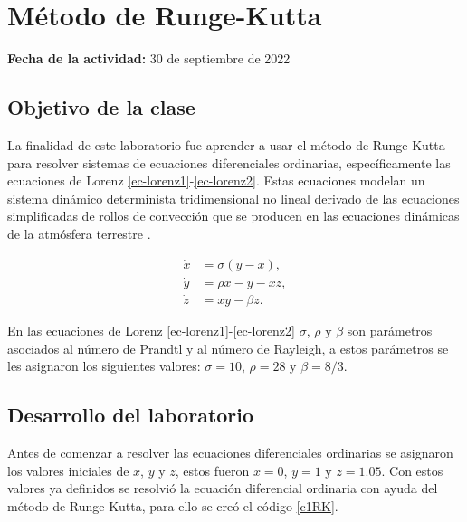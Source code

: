 \documentclass[../portafolio.tex]{subfiles}
\begin{document}
\section{Método de Runge-Kutta} 

\hfill \textbf{Fecha de la actividad:} 30 de septiembre de 2022

\medskip


\subsection{Objetivo de la clase}
La finalidad de este laboratorio fue aprender a usar el método de Runge-Kutta para resolver sistemas de ecuaciones diferenciales ordinarias, específicamente las ecuaciones de Lorenz \ref{ec-lorenz1}-\ref{ec-lorenz2}. Estas ecuaciones modelan un sistema dinámico determinista tridimensional no lineal derivado de las ecuaciones simplificadas de rollos de convección que se producen en las ecuaciones dinámicas de la atmósfera terrestre \cite{ec-de-lorenz}.

\begin{align}
    \dot{x} &= \sigma (y-x),  \label{ec-lorenz1}\\
    \dot{y} &= \rho x -y -xz, \\
    \dot{z} &= xy - \beta z . \label{ec-lorenz2}
\end{align}

En las ecuaciones de Lorenz \ref{ec-lorenz1}-\ref{ec-lorenz2} $\sigma$, $\rho$ y $\beta$ son parámetros asociados al número de Prandtl y al número de Rayleigh, a estos parámetros se les asignaron los siguientes valores: $\sigma=10$, $\rho=28$ y $\beta=8/3$.

\subsection{Desarrollo del laboratorio}

Antes de comenzar a resolver las ecuaciones diferenciales ordinarias se asignaron los valores iniciales de $x$, $y$ y $z$, estos fueron $x=0$, $y=1$ y $z=1.05$. Con estos valores ya definidos se resolvió la ecuación diferencial ordinaria con ayuda del método de Runge-Kutta, para ello se creó el código \ref{c1RK}.
\end{document}
